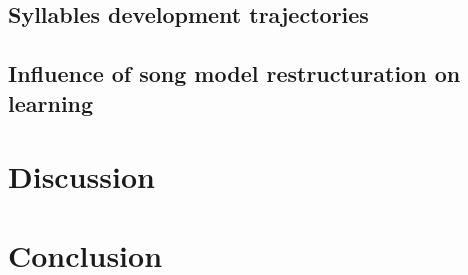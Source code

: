\documentclass{report}
\begin{document}
\section{Syllables development trajectories}

\section{Influence of song model restructuration on learning}

\chapter{Discussion}

\chapter{Conclusion}

\printbibliography{}
\end{document}
